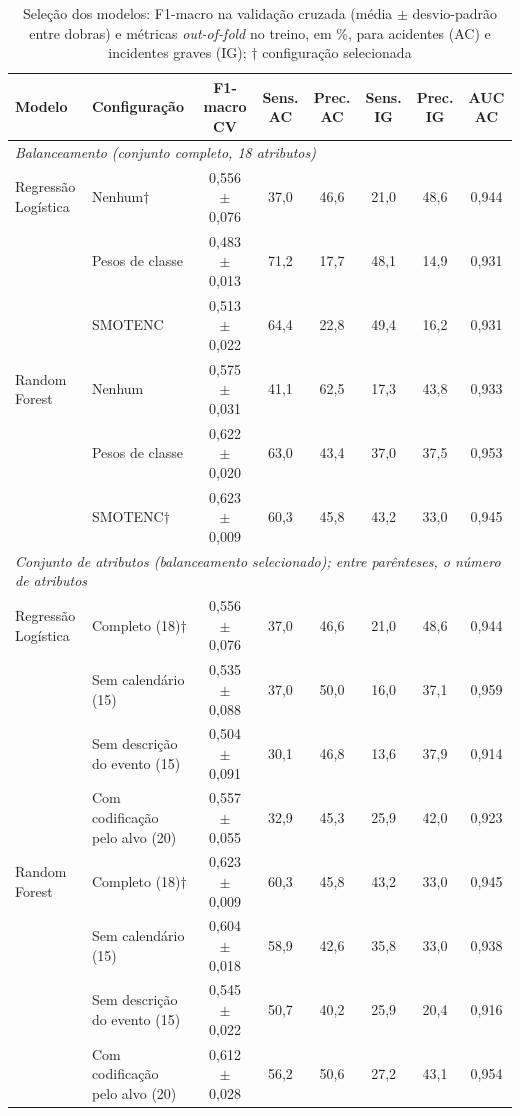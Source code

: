 \documentclass[12pt]{article}
\begin{document}
\begin{table}[htbp]
    \centering
    \caption{Seleção dos modelos: F1-macro na validação cruzada (média $\pm$ desvio-padrão entre dobras) e métricas \textit{out-of-fold} no treino, em \%, para acidentes (AC) e incidentes graves (IG); $\dagger$ configuração selecionada}
    \vspace{0.05cm}
    \scriptsize\setlength{\tabcolsep}{3.5pt}\renewcommand{\arraystretch}{0.88}
    \begin{tabular}{llcccccc}
\toprule
\textbf{Modelo} & \textbf{Configuração} & \textbf{F1-macro CV} & \textbf{Sens. AC} & \textbf{Prec. AC} & \textbf{Sens. IG} & \textbf{Prec. IG} & \textbf{AUC AC} \\
\midrule
\multicolumn{8}{l}{\textit{Balanceamento (conjunto completo, 18 atributos)}} \\
\midrule
Regressão Logística & Nenhum$\dagger$ & 0,556 $\pm$ 0,076 & 37,0 & 46,6 & 21,0 & 48,6 & 0,944 \\
 & Pesos de classe & 0,483 $\pm$ 0,013 & 71,2 & 17,7 & 48,1 & 14,9 & 0,931 \\
 & SMOTENC & 0,513 $\pm$ 0,022 & 64,4 & 22,8 & 49,4 & 16,2 & 0,931 \\
\midrule
Random Forest & Nenhum & 0,575 $\pm$ 0,031 & 41,1 & 62,5 & 17,3 & 43,8 & 0,933 \\
 & Pesos de classe & 0,622 $\pm$ 0,020 & 63,0 & 43,4 & 37,0 & 37,5 & 0,953 \\
 & SMOTENC$\dagger$ & 0,623 $\pm$ 0,009 & 60,3 & 45,8 & 43,2 & 33,0 & 0,945 \\
\midrule
\multicolumn{8}{l}{\textit{Conjunto de atributos (balanceamento selecionado); entre parênteses, o número de atributos}} \\
\midrule
Regressão Logística & Completo (18)$\dagger$ & 0,556 $\pm$ 0,076 & 37,0 & 46,6 & 21,0 & 48,6 & 0,944 \\
 & Sem calendário (15) & 0,535 $\pm$ 0,088 & 37,0 & 50,0 & 16,0 & 37,1 & 0,959 \\
 & Sem descrição do evento (15) & 0,504 $\pm$ 0,091 & 30,1 & 46,8 & 13,6 & 37,9 & 0,914 \\
 & Com codificação pelo alvo (20) & 0,557 $\pm$ 0,055 & 32,9 & 45,3 & 25,9 & 42,0 & 0,923 \\
\midrule
Random Forest & Completo (18)$\dagger$ & 0,623 $\pm$ 0,009 & 60,3 & 45,8 & 43,2 & 33,0 & 0,945 \\
 & Sem calendário (15) & 0,604 $\pm$ 0,018 & 58,9 & 42,6 & 35,8 & 33,0 & 0,938 \\
 & Sem descrição do evento (15) & 0,545 $\pm$ 0,022 & 50,7 & 40,2 & 25,9 & 20,4 & 0,916 \\
 & Com codificação pelo alvo (20) & 0,612 $\pm$ 0,028 & 56,2 & 50,6 & 27,2 & 43,1 & 0,954 \\
\bottomrule
\end{tabular}
    \label{tab:selecao}
\end{table}
\end{document}
